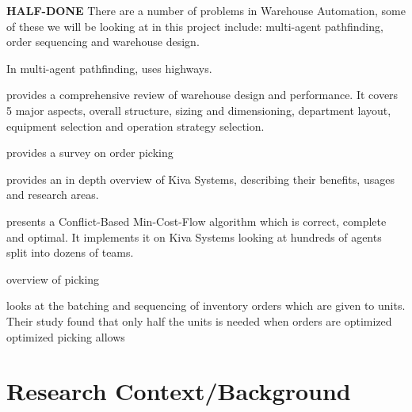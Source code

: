 \documentclass[a4paper,11pt]{article}
\begin{document}
\textbf{HALF-DONE} There are a number of problems in Warehouse Automation, some of these we will be looking at in this project include: multi-agent pathfinding, order sequencing and warehouse design.

In multi-agent pathfinding, \cite{cohen2016bounded} uses highways.

\cite{gu2010research} provides a comprehensive review of warehouse design and performance. It covers 5 major aspects, overall structure, sizing and dimensioning, department layout, equipment selection and operation strategy selection.

\cite{de2007design} provides a survey on order picking

\cite{wurman2008coordinating} provides an in depth overview of Kiva Systems, describing their benefits, usages and research areas.




\cite{ma2016optimal} presents a Conflict-Based Min-Cost-Flow algorithm which is correct, complete and optimal. It implements it on Kiva Systems looking at hundreds of agents split into dozens of teams.







\cite{de2007design} overview of picking

\cite{boysen2017parts} looks at the batching and sequencing of inventory orders which are given to units. Their study found that only half the units is needed when orders are optimized optimized picking allows




\section{Research Context/Background}


\end{document}
